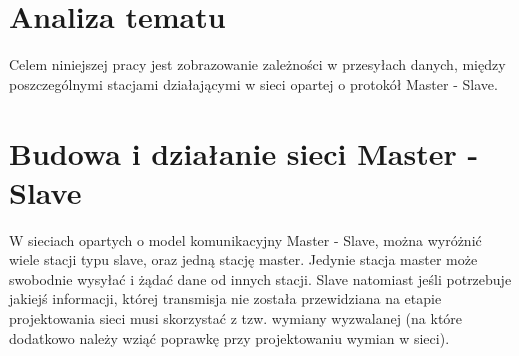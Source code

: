 \section{Analiza tematu}
Celem niniejszej pracy jest zobrazowanie zależności w przesyłach danych, między poszczególnymi stacjami działającymi w sieci opartej o protokół Master - Slave.

\section{Budowa i działanie sieci Master - Slave}
W sieciach opartych o model komunikacyjny Master - Slave, można wyróżnić wiele stacji typu slave, oraz jedną stację master. Jedynie stacja master może swobodnie wysyłać i żądać dane od innych stacji. Slave natomiast jeśli potrzebuje jakiejś informacji, której transmisja nie została przewidziana na etapie projektowania sieci musi skorzystać z tzw. wymiany wyzwalanej (na które dodatkowo należy wziąć poprawkę przy projektowaniu wymian w sieci).